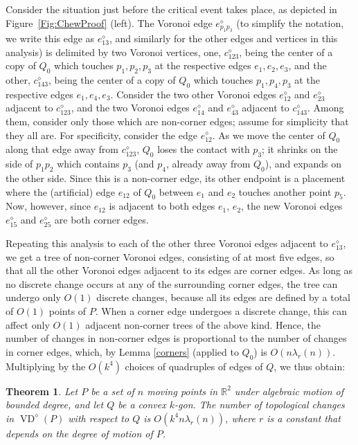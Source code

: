 \documentclass[letter,11pt]{article}
\newtheorem{theorem}{Theorem}[section]
\def \reals{{\mathbb R}}
\def\poly{\diamond}
\def\VD{\mathop{\mathrm{VD}}}
\begin{document}
Consider the situation just before the critical event takes place,
as depicted in Figure~\ref{Fig:ChewProof} (left).
The Voronoi edge $e_{p_1p_3}^\poly$ (to simplify the notation, we write this edge as $e_{13}^\poly$, and similarly for the other edges and vertices in this analysis) is delimited by two Voronoi vertices,
one, $c^\poly_{123}$, being the center of a copy of $Q_0$ which
touches $p_1,p_2,p_3$ at the respective edges $e_1,e_2,e_3$,
and the other, $c_{143}^\poly$, being the center of a copy of
$Q_0$ which touches $p_1,p_4,p_3$ at the respective edges
$e_1,e_4,e_3$. Consider the two other Voronoi edges $e_{12}^\poly$ and
$e_{23}^\poly$ adjacent to $c_{123}^\poly$, and
the two Voronoi edges $e_{14}^\poly$ and
$e_{43}^\poly$ adjacent to $c_{143}^\poly$.
Among them, consider only those which are non-corner edges;
assume for simplicity that they all are.
For specificity, consider the edge $e_{12}^\poly$. As we move
the center of $Q_0$ along that edge away from $c_{123}^\poly$,
$Q_0$ loses the contact with $p_3$; it shrinks on the side of
$p_1p_2$ which contains $p_3$ (and $p_4$, already away from $Q_0$),
and expands on the other side. Since this is a non-corner edge,
its other endpoint is a placement where the (artificial) edge
$e_{12}$ of $Q_0$ between $e_1$ and $e_2$ touches another point
$p_{5}$. Now, however, since $e_{12}$ is adjacent to both edges
$e_1$, $e_2$, the new Voronoi edges $e^\poly_{15}$ and
$e_{25}^\poly$ are both corner edges.


Repeating this analysis to each of the other three Voronoi edges
adjacent to $e_{13}^\poly$, we get a tree of non-corner Voronoi edges,
consisting of at most five edges, so that all the other Voronoi edges
adjacent to its edges are corner edges. As long as no discrete change occurs at any of the surrounding corner edges, the tree can undergo only $O(1)$ discrete changes, because all its edges are defined by a total of $O(1)$ points of $P$. When a corner edge undergoes a discrete change, this can affect only $O(1)$ adjacent non-corner trees of the above kind. Hence, the number of changes in non-corner edges is proportional to the number
of changes in corner edges, which, by Lemma \ref{corners} (applied to $Q_0$) is $O(n\lambda_r(n))$. Multiplying by the $O(k^4)$ choices of quadruples of edges of $Q$, we thus obtain:

\begin{theorem} \label{Thm:PolygonalVoronoi}
Let $P$ be a set of $n$ moving points in $\reals^2$ under algebraic
motion of bounded degree, and let $Q$ be a convex $k$-gon.
The number of topological changes in $\VD^\poly(P)$ with respect to $Q$
 is $O(k^4n\lambda_r(n))$, where $r$ is a
constant that depends on the degree of motion of $P$.
\end{theorem}
\end{document}
